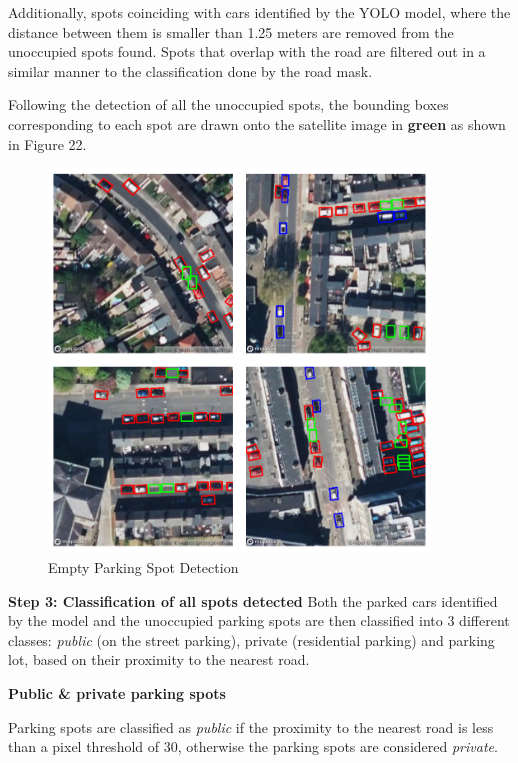 Additionally, spots coinciding with cars identified by the YOLO model, where the
distance between them is smaller than 1.25 meters are removed from the unoccupied
spots found. Spots that overlap with the road are filtered out in a similar
manner to the classification done by the road mask.

Following the detection of all the unoccupied spots, the bounding boxes
corresponding to each spot are drawn onto the satellite image in \textbf{green} as shown
in Figure 22.

\begin{figure}[htbp]
  \centering
  \includegraphics[width=0.9\textwidth]{images/empty-parking-detection.png}
  \caption{Empty Parking Spot Detection}
  \label{fig:Empty_parking_detection}
\end{figure}

\newpage{}

\textbf{Step 3: Classification of all spots detected}
Both the parked cars identified by the model and the unoccupied parking spots are
then classified into 3 different classes: \emph{public} (on the street parking),
private (residential parking) and parking lot, based on their proximity to the
nearest road.

\hspace{2em}\textbf{Public \& private parking spots}

Parking spots are classified as \emph{public} if the proximity to the nearest
road is less than a pixel threshold of 30, otherwise the parking spots are
considered \emph{private}.


